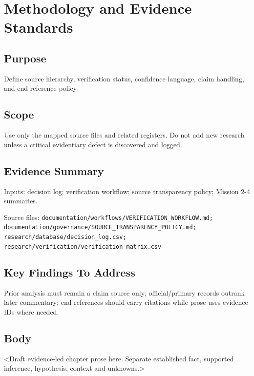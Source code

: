 
\chapter{Methodology and Evidence Standards}
\label{chap:02-methodology}


\section{Purpose}
Define source hierarchy, verification status, confidence language, claim handling, and end-reference policy.

\section{Scope}
Use only the mapped source files and related registers. Do not add new research unless a critical evidentiary defect is discovered and logged.

\section{Evidence Summary}
Inputs: decision log; verification workflow; source transparency policy; Mission 2-4 summaries.

Source files: \texttt{documentation/workflows/VERIFICATION_WORKFLOW.md; documentation/governance/SOURCE_TRANSPARENCY_POLICY.md; research/database/decision_log.csv; research/verification/verification_matrix.csv}

\section{Key Findings To Address}
Prior analysis must remain a claim source only; official/primary records outrank later commentary; end references should carry citations while prose uses evidence IDs where needed.

\section{Body}
<Draft evidence-led chapter prose here. Separate established fact, supported inference, hypothesis, context and unknowns.>

